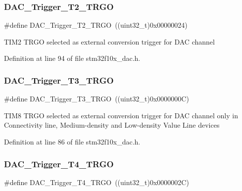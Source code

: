 \subsubsection{\texorpdfstring{D\+A\+C\+\_\+\+Trigger\+\_\+\+T2\+\_\+\+T\+R\+GO}{DAC\_Trigger\_T2\_TRGO}}
{\footnotesize\ttfamily \#define D\+A\+C\+\_\+\+Trigger\+\_\+\+T2\+\_\+\+T\+R\+GO~((uint32\+\_\+t)0x00000024)}

T\+I\+M2 T\+R\+GO selected as external conversion trigger for D\+AC channel 

Definition at line 94 of file stm32f10x\+\_\+dac.\+h.

\mbox{\label{group___d_a_c__trigger__selection_ga82cbaedc35164c8b9fe0be2faec9b909}} 
\subsubsection{\texorpdfstring{D\+A\+C\+\_\+\+Trigger\+\_\+\+T3\+\_\+\+T\+R\+GO}{DAC\_Trigger\_T3\_TRGO}}
{\footnotesize\ttfamily \#define D\+A\+C\+\_\+\+Trigger\+\_\+\+T3\+\_\+\+T\+R\+GO~((uint32\+\_\+t)0x0000000\+C)}

T\+I\+M8 T\+R\+GO selected as external conversion trigger for D\+AC channel only in Connectivity line, Medium-\/density and Low-\/density Value Line devices 

Definition at line 86 of file stm32f10x\+\_\+dac.\+h.

\mbox{\label{group___d_a_c__trigger__selection_ga58ccb2de3d22d66ee975152f5edb330a}} 
\subsubsection{\texorpdfstring{D\+A\+C\+\_\+\+Trigger\+\_\+\+T4\+\_\+\+T\+R\+GO}{DAC\_Trigger\_T4\_TRGO}}
{\footnotesize\ttfamily \#define D\+A\+C\+\_\+\+Trigger\+\_\+\+T4\+\_\+\+T\+R\+GO~((uint32\+\_\+t)0x0000002\+C)}

